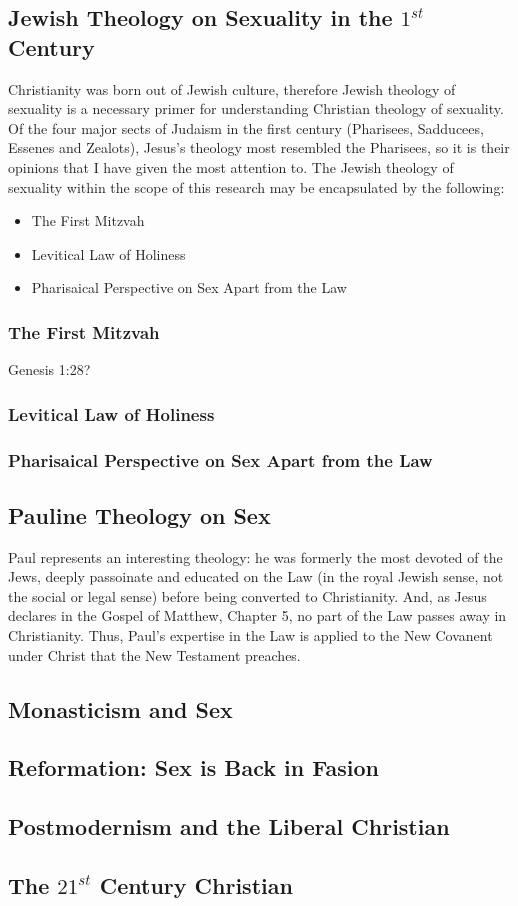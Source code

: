 \documentclass{article}
\begin{document}
\subsection{Jewish Theology on Sexuality in the $1^{st}$ Century}
    Christianity was born out of Jewish culture, therefore Jewish theology
    of sexuality is a necessary primer for understanding Christian theology
    of sexuality. Of the four major sects of Judaism in the first century
    (Pharisees, Sadducees, Essenes and Zealots), Jesus's theology most
    resembled the Pharisees\cite{finkelstein_1929}, so it is their 
    opinions that I have given the most attention to.
    The Jewish theology of sexuality within the scope of this research
    may be encapsulated by the following:
    \begin{itemize}
        \item{The First Mitzvah}
        \item{Levitical Law of Holiness}
        \item{Pharisaical Perspective on Sex Apart from the Law}
    \end{itemize}

    \subsubsection{The First Mitzvah}
        Genesis 1:28?

    \subsubsection{Levitical Law of Holiness}
    \subsubsection{Pharisaical Perspective on Sex Apart from the Law}

\subsection{Pauline Theology on Sex}

    Paul represents an interesting theology: he was formerly the most
    devoted of the Jews, deeply passoinate and educated on the Law (in
    the royal Jewish sense, not the social or legal sense) before being
    converted to Christianity. 
    And, as Jesus declares in the Gospel of Matthew, Chapter 5, no part
    of the Law passes away in Christianity. Thus, Paul's expertise in the
    Law is applied to the New Covanent under Christ that the New
    Testament preaches.

\subsection{Monasticism and Sex}
\subsection{Reformation: Sex is Back in Fasion}
\subsection{Postmodernism and the Liberal Christian}
\subsection{The $21^{st}$ Century Christian}

  

\end{document}

